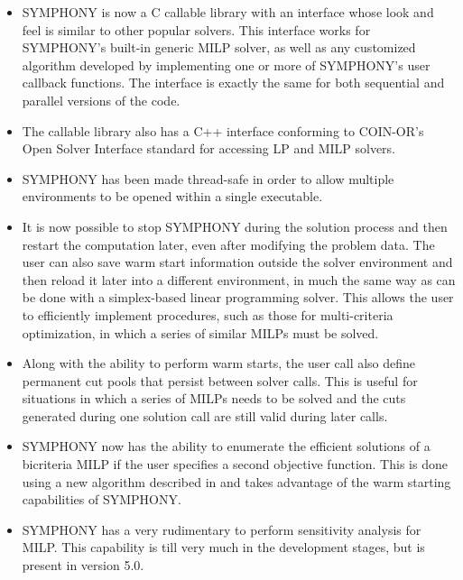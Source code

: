 \begin{itemize}

\item SYMPHONY is now a C callable library with an interface whose look and
feel is similar to other popular solvers. This interface works for SYMPHONY's
built-in generic MILP solver, as well as any customized algorithm developed by
implementing one or more of SYMPHONY's user callback functions. The interface
is exactly the same for both sequential and parallel versions of the code.

\item The callable library also has a C++ interface conforming to COIN-OR's
Open Solver Interface standard for accessing LP and MILP solvers.

\item SYMPHONY has been made thread-safe in order to allow multiple
environments to be opened within a single executable.

\item It is now possible to stop SYMPHONY during the solution process and then
restart the computation later, even after modifying the problem data. The user
can also save warm start information outside the solver environment and then
reload it later into a different environment, in much the same way as can be
done with a simplex-based linear programming solver. This allows the user to
efficiently implement procedures, such as those for multi-criteria
optimization, in which a series of similar MILPs must be solved.

\item Along with the ability to perform warm starts, the user call also define
permanent cut pools that persist between solver calls. This is useful for
situations in which a series of MILPs needs to be solved and the cuts
generated during one solution call are still valid during later calls.

\item SYMPHONY now has the ability to enumerate the efficient solutions of a
bicriteria MILP if the user specifies a second objective function. This is
done using a new algorithm described in \cite{WCN} and takes advantage of the
warm starting capabilities of SYMPHONY.

\item SYMPHONY has a very rudimentary to perform sensitivity analysis for
MILP. This capability is till very much in the development stages, but is
present in version 5.0.

\end{itemize}

